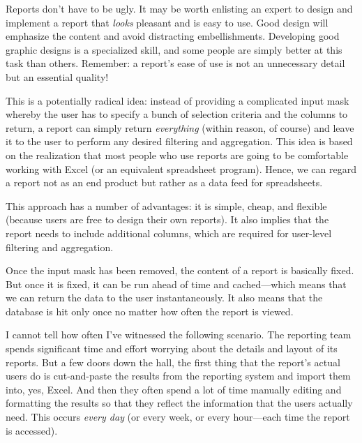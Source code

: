 Reports don't have to be ugly.  It may be worth enlisting an expert to
design and implement a report that \emph{looks} pleasant and is easy
to use. Good design will emphasize the content and avoid distracting
embellishments.  Developing good graphic designs is a specialized
skill, and some people are simply better at this task than others.
Remember: a report's ease of use is not an unnecessary detail but an
essential quality!\vfill\pagebreak

 This is a potentially radical idea: instead of providing a
complicated input mask whereby the user has to specify a bunch of selection
criteria and the columns to return, a report can simply return
\emph{everything} (within reason, of course) and leave it to the user
to perform any desired filtering and aggregation.  This idea is based
on the realization that most people who use reports are going to be
comfortable working with Excel (or an equivalent spreadsheet program).
Hence, we can regard a report not as an end product but rather as a
data feed for spreadsheets.

This approach has a number of advantages: it is simple, cheap, and
flexible (because users are free to design their own reports). It also
implies that the report needs to include additional columns, which are
required for user-level filtering and aggregation.

Once the input mask has been removed, the content of a report is
basically fixed. But once it is fixed, it can be run ahead of time and
cached---which means that we can return the data to the user
instantaneously. It also means that the database is hit only once no
matter how often the report is viewed.

 I cannot tell how often I've witnessed the following scenario. The
reporting team spends significant time and effort worrying about the
details and layout of its reports. But a few doors down the hall, the
first thing that the report's actual users do is cut-and-paste the
results from the reporting system and import them into, yes, Excel.
And then they often spend a lot of time manually editing and
formatting the results so that they reflect the information that the
users actually need. This occurs \emph{every day} (or every week, or
every hour---each time the report is accessed).

